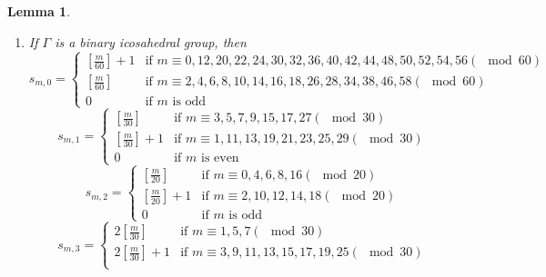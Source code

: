 \documentclass{amsart}[12pt]
\newtheorem{lemma}[theorem]{Lemma}
\theoremstyle{definition}
\theoremstyle{remark}
\numberwithin{equation}{section}
\begin{document}
\begin{lemma}
\begin{enumerate}
\[\begin{cases}
[\frac{m}{8}] + 1 & \textrm{if $m \equiv 4, 6 (\mod 8)$ } \\
0 & \textrm{if $m$ is odd}
\end{cases}
\]
\[
s_{m, 6} = \begin{cases} 
2[\frac{m}{24}] & \textrm{if $m \equiv 1, 3, 9 (\mod 24)$ } \\
2[\frac{m}{24}] + 1 & \textrm{if $m \equiv 5, 7, 11, 15, 17 (\mod 24)$ } \\
2[\frac{m}{24}] + 2 & \textrm{if $m \equiv 13, 19, 21, 23 (\mod 24)$ } \\
0 & \textrm{if $m$ is even}
\end{cases} 
\]
\[
s_{m, 7} = \begin{cases} 
[\frac{m}{24}] & \textrm{if $m \equiv 0, 2, 4, 8, 10, 16 (\mod 24)$ } \\
[\frac{m}{24}] + 1 & \textrm{if $m \equiv 6, 12, 14, 18, 20, 22 (\mod 24)$ } \\
0 & \textrm{if $m$ is odd}
\end{cases}
\]
\item If $\Gamma$ is a binary icosahedral group, then
\[
s_{m, 0} = \begin{cases} 
[\frac{m}{60}] + 1 & \textrm{if $m \equiv 0, 12, 20, 22, 24, 30, 32, 36, 40, 42, 44, 48, 50, 52, 54, 56 (\mod 60)$ } \\
[\frac{m}{60}] & \textrm{if $m \equiv 2, 4, 6, 8, 10, 14, 16, 18, 26, 28, 34, 38, 46, 58 (\mod 60)$ } \\
0 & \textrm{if $m$ is odd}
\end{cases}
\]
\[
s_{m, 1}  = \begin{cases} 
[\frac{m}{30}] & \textrm{if $m \equiv 3, 5, 7, 9, 15, 17, 27 (\mod 30)$ } \\
[\frac{m}{30}] + 1 & \textrm{if $m \equiv 1, 11, 13, 19, 21, 23, 25, 29 (\mod 30)$ } \\
0 & \textrm{if $m$ is even}
\end{cases}
\]
\[
s_{m, 2}  = \begin{cases} 
[\frac{m}{20}] & \textrm{if $m \equiv 0, 4, 6, 8,16 (\mod 20)$ } \\
[\frac{m}{20}] + 1 & \textrm{if $m \equiv 2, 10, 12, 14, 18 (\mod 20)$ } \\
0 & \textrm{if $m$ is odd}
\end{cases}
\]
\[
s_{m, 3}  = \begin{cases} 
2[\frac{m}{30}] & \textrm{if $m \equiv 1, 5, 7 (\mod 30)$ } \\
2[\frac{m}{30}] + 1 & \textrm{if $m \equiv 3, 9, 11, 13, 15, 17, 19, 25 (\mod 30)$ } \\

\end{cases}\]
\end{enumerate}
\end{lemma}
\end{document}

